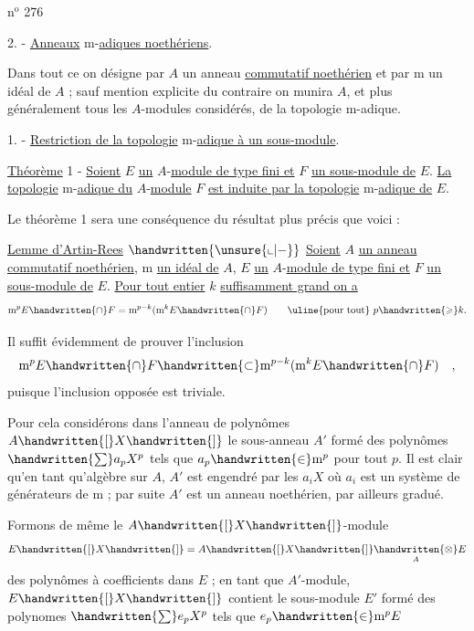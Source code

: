\hfill n$^{\mathrm{o}}$ 276

\handwritten{\S{}}2. - \uline{Anneaux} $\mathrm{m}$-\uline{adiques noethériens}.

Dans tout ce \handwritten{\S{}} on désigne par $A$ un anneau \uline{commutatif noethérien} et par $\mathrm{m}$ un idéal de $A$ ; sauf mention explicite du contraire on munira $A$, et plus généralement tous les $A$-modules considérés, de la topologie $\mathrm{m}$-adique.

1. - \uline{Restriction de la topologie} $\mathrm{m}$-\uline{adique à un sous-module}.

\uline{Théorème} 1 - \uline{Soient} $E$ \uline{un} $A$-\uline{module de type fini et} $F$ \uline{un sous-module de} $E$. \uline{La topologie} $\mathrm{m}$-\uline{adique du} $A$-\uline{module} $F$ \uline{est induite par la topologie} $\mathrm{m}$-\uline{adique de} \unsure{-|} $E$.

Le théorème 1 sera une conséquence du résultat plus précis que voici :

\uline{Lemme d'Artin-Rees} $\handwritten{\unsure{\llcorner|-}}$ \uline{Soient} $A$ \uline{un anneau commutatif noethérien}, $\mathrm{m}$ \uline{un idéal de} $A$, $E$ \uline{un} $A$-\uline{module de type fini et} $F$ \uline{un sous-module de} $E$. \uline{Pour tout entier} $k$ \uline{suffisamment grand on a}
\[
\mathrm{m}^{p}E\handwritten{\cap} F=\mathrm{m}^{p-k}(\mathrm{m}^{k}E\handwritten{\cap} F)\qquad \text{\uline{pour tout}}~p\handwritten{\geqslant} k.
\]

Il suffit évidemment de prouver l'inclusion \unsure{-|}
\[
\mathrm{m}^{p}E\handwritten{\cap} F\handwritten{\subset}\mathrm{m}^{p-k}(\mathrm{m}^{k}E\handwritten{\cap} F)\quad,
\]
puisque l'inclusion opposée est triviale.

Pour cela considérons dans l'anneau de polynômes $A\handwritten{[}X\handwritten{]}$ le sous-anneau $A'$ formé des polynômes $\handwritten{\sum} a_p X^p$ tels que $a_p\handwritten{\in}\mathrm{m}^p$ pour tout $p$. Il est clair qu'en tant qu'algèbre sur $A$, $A'$ est engendré par les $a_i X$ où $a_i$ est un système de générateurs de $\mathrm{m}$ ; par suite $A'$ est un anneau noethérien, par ailleurs gradué.

Formons de même le $A\handwritten{[}X\handwritten{]}$-module
\[
E\handwritten{[}X\handwritten{]}=A\handwritten{[}X\handwritten{]}\underset{A}{\handwritten{\otimes}}E
\]
des polynômes à coefficients dans $E$ ; en tant que $A'$-module, $E\handwritten{[}X\handwritten{]}$ contient le sous-module $E'$ formé des polynomes $\handwritten{\sum} e_p X^p$ tels que $e_p\handwritten{\in}\mathrm{m}^p E$

